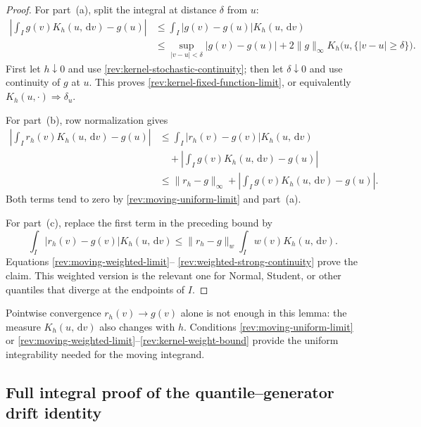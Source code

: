 \documentclass[11pt]{article}
\theoremstyle{remark}
\newcommand{\dd}{\,\mathrm d}
\begin{document}
\begin{proof}
For part~(a), split the integral at distance $\delta$ from $u$:
\begin{align*}
\left|\int_Ig(v)K_h(u,\dd v)-g(u)\right|
&\le \int_I|g(v)-g(u)|K_h(u,\dd v)\\
&\le \sup_{|v-u|<\delta}|g(v)-g(u)|
 +2\lVert g\rVert_\infty
 K_h\bigl(u,\{|v-u|\ge\delta\}\bigr).
\end{align*}
First let $h\downarrow0$ and use
\eqref{rev:kernel-stochastic-continuity}; then let $\delta\downarrow0$ and
use continuity of $g$ at $u$.  This proves
\eqref{rev:kernel-fixed-function-limit}, or equivalently
$K_h(u,\cdot)\Rightarrow\delta_u$.

For part~(b), row normalization gives
\begin{align*}
\left|\int_Ir_h(v)K_h(u,\dd v)-g(u)\right|
&\le \int_I|r_h(v)-g(v)|K_h(u,\dd v)\\
&\quad+\left|\int_Ig(v)K_h(u,\dd v)-g(u)\right|\\
&\le \lVert r_h-g\rVert_\infty
 +\left|\int_Ig(v)K_h(u,\dd v)-g(u)\right|.
\end{align*}
Both terms tend to zero by \eqref{rev:moving-uniform-limit} and part~(a).

For part~(c), replace the first term in the preceding bound by
\[
\int_I|r_h(v)-g(v)|K_h(u,\dd v)
\le \lVert r_h-g\rVert_w\int_Iw(v)K_h(u,\dd v).
\]
Equations \eqref{rev:moving-weighted-limit}--
\eqref{rev:weighted-strong-continuity} prove the claim.  This weighted version
is the relevant one for Normal, Student, or other quantiles that diverge at the
endpoints of $I$.
\end{proof}

Pointwise convergence $r_h(v)\to g(v)$ alone is not enough in this lemma: the
measure $K_h(u,\dd v)$ also changes with $h$.  Conditions
\eqref{rev:moving-uniform-limit} or
\eqref{rev:moving-weighted-limit}--\eqref{rev:kernel-weight-bound} provide the
uniform integrability needed for the moving integrand.

\subsection{Full integral proof of the quantile--generator drift identity}
\label{rev:app-drift-identity-proof}
\end{document}
